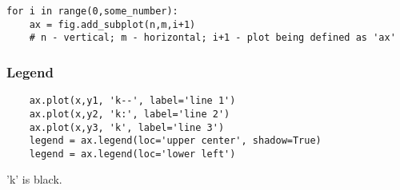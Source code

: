 \documentclass{article}
\begin{document}
\begin{verbatim}
for i in range(0,some_number):
    ax = fig.add_subplot(n,m,i+1)
    # n - vertical; m - horizontal; i+1 - plot being defined as 'ax'
\end{verbatim}

\subsubsection*{Legend}
\begin{verbatim}
    ax.plot(x,y1, 'k--', label='line 1')
    ax.plot(x,y2, 'k:', label='line 2')
    ax.plot(x,y3, 'k', label='line 3')
    legend = ax.legend(loc='upper center', shadow=True)
    legend = ax.legend(loc='lower left')
\end{verbatim}
'k' is black.
\end{document}
